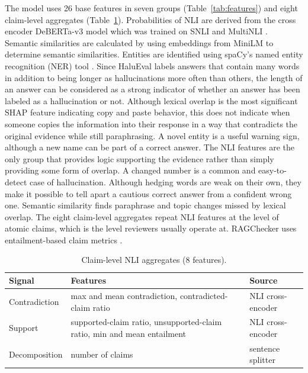 \documentclass[a4paper,fleqn]{cas-sc}
\begin{document}
The model uses 26 base features in seven groups (Table~\ref{tab:features}) and eight claim-level aggregates (Table~\ref{tab:claim}). Probabilities of NLI are derived from the cross encoder DeBERTa-v3 model \cite{deberta} which was trained on SNLI \cite{snli} and MultiNLI \cite{mnli}. Semantic similarities are calculated by using embeddings from MiniLM \cite{sbert,minilm} to determine semantic similarities. Entities are identified using spaCy's named entity recognition (NER) tool \cite{spacy}. Since HaluEval labels answers that contain many words in addition to being longer as hallucinations more often than others, the length of an answer can be considered as a strong indicator of whether an answer has been labeled as a hallucination or not. Although lexical overlap is the most significant SHAP feature indicating copy and paste behavior, this does not indicate when someone copies the information into their response in a way that contradicts the original evidence while still paraphrasing. A novel entity is a useful warning sign, although a new name can be part of a correct answer. The NLI features are the only group that provides logic supporting the evidence rather than simply providing some form of overlap. A changed number is a common and easy-to-detect case of hallucination. Although hedging words are weak on their own, they make it possible to tell apart a cautious correct answer from a confident wrong one. Semantic similarity finds paraphrase and topic changes missed by lexical overlap. The eight claim-level aggregates repeat NLI features at the level of atomic claims, which is the level reviewers usually operate at. RAGChecker uses entailment-based claim metrics \cite{ru2024ragchecker}.


\begin{table}[pos=b]
  \centering
  \caption{Claim-level NLI aggregates (8 features).}
  \label{tab:claim}
  \begin{tabular}{>{\raggedright\arraybackslash}p{2.3cm}>{\raggedright\arraybackslash}p{7.0cm}>{\raggedright\arraybackslash}p{2.9cm}}
    \toprule
    \textbf{Signal} & \textbf{Features}                                                       & \textbf{Source}   \\
    \midrule
    Contradiction   & max and mean contradiction, contradicted-claim ratio                    & NLI cross-encoder \\
    Support         & supported-claim ratio, unsupported-claim ratio, min and mean entailment & NLI cross-encoder \\
    Decomposition   & number of claims                                                        & sentence splitter \\
    \bottomrule
  \end{tabular}
\end{table}
\end{document}
